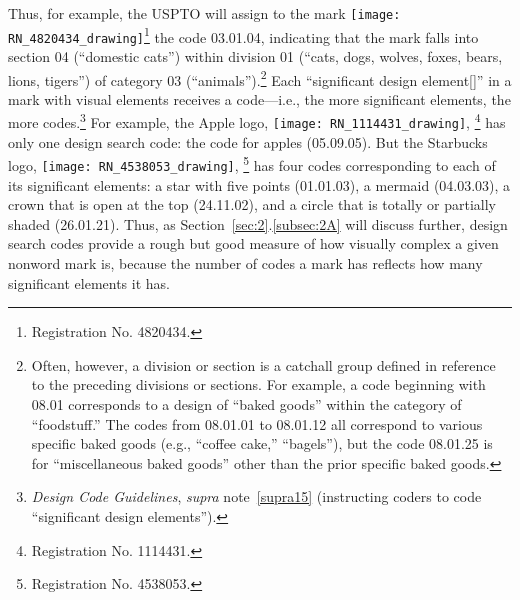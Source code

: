 \documentclass[letterpaper, 11pt, oneside]{article}
\begin{document}
Thus, for example, the USPTO will assign to the mark \texttt{[image: RN\_4820434\_drawing]}\footnote{Registration No. 4820434.} the code 03.01.04, indicating that the mark falls into section 04 (``domestic cats'') within division 01 (``cats, dogs, wolves, foxes, bears, lions, tigers'') of category 03 (``animals'').\footnote{Often, however, a division or section is a catchall group defined in reference to the preceding divisions or sections. For example, a code beginning with 08.01 corresponds to a design of ``baked goods'' within the category of ``foodstuff.'' The codes from 08.01.01 to 08.01.12 all correspond to various specific baked goods (e.g., ``coffee cake,'' ``bagels''), but the code 08.01.25 is for ``miscellaneous baked goods'' other than the prior specific baked goods.} Each ``significant design element[]'' in a mark with visual elements receives a code—i.e., the more significant elements, the more codes.\footnote{\textit{Design Code Guidelines}, \textit{supra} note~\ref{supra15} (instructing coders to code ``significant design elements'').} For example, the Apple logo, \texttt{[image: RN\_1114431\_drawing]}, \footnote{Registration No. 1114431.} has only one design search code: the code for apples (05.09.05). But the Starbucks logo, \texttt{[image: RN\_4538053\_drawing]}, \footnote{Registration No. 4538053.} has four codes corresponding to each of its significant elements: a star with five points (01.01.03), a mermaid (04.03.03), a crown that is open at the top (24.11.02), and a circle that is totally or partially shaded (26.01.21). Thus, as Section~\ref{sec:2}.\ref{subsec:2A} will discuss further, design search codes provide a rough but good measure of how visually complex a given nonword mark is, because the number of codes a mark has reflects how many significant elements it has.
\end{document}
